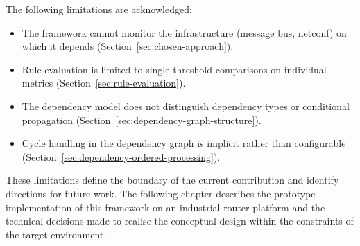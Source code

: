 The following limitations are acknowledged:

\begin{itemize}
\item The framework cannot monitor the infrastructure (message bus, \gls{netconf}) on which it depends (Section~\ref{sec:chosen-approach}).
\item Rule evaluation is limited to single-threshold comparisons on individual metrics (Section~\ref{sec:rule-evaluation}).
\item The dependency model does not distinguish dependency types or conditional propagation (Section~\ref{sec:dependency-graph-structure}).
\item Cycle handling in the dependency graph is implicit rather than configurable (Section~\ref{sec:dependency-ordered-processing}).
\end{itemize}

These limitations define the boundary of the current contribution and identify directions for future work. The following chapter describes the prototype implementation of this framework on an industrial router platform and the technical decisions made to realise the conceptual design within the constraints of the target environment.

